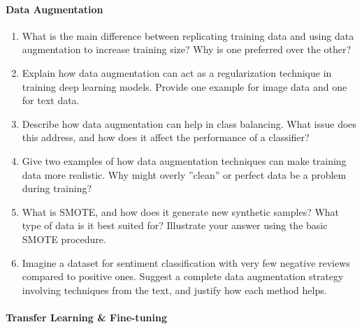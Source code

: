 \paragraph*{Data Augmentation}
\begin{enumerate}[nosep]
    \item What is the main difference between replicating training data and using data augmentation to increase training size? Why is one preferred over the other?

    \item Explain how data augmentation can act as a regularization technique in training deep learning models. Provide one example for image data and one for text data.

    \item Describe how data augmentation can help in class balancing. What issue does this address, and how does it affect the performance of a classifier?

    \item Give two examples of how data augmentation techniques can make training data more realistic. Why might overly ''clean'' or perfect data be a problem during training?

    \item What is SMOTE, and how does it generate new synthetic samples? What type of data is it best suited for? Illustrate your answer using the basic SMOTE procedure.

    \item Imagine a dataset for sentiment classification with very few negative reviews compared to positive ones. Suggest a complete data augmentation strategy involving techniques from the text, and justify how each method helps.
\end{enumerate}

\paragraph*{Transfer Learning \& Fine-tuning}

